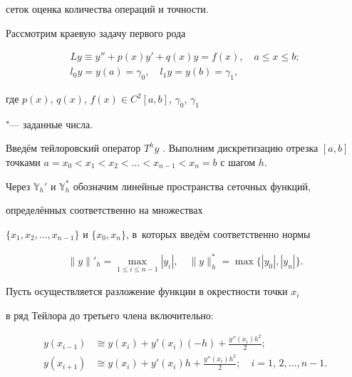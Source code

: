 сеток оценка количества операций и точности.



\smallskip




Рассмотрим краевую задачу первого рода

\begin{gather}

\label{pavlova:eq1}

 Ly\equiv y''+p(x)y'+q(x)y=f(x),\quad a\le x\le b;\\

\label{pavlova:eq2}

 l_0 y=y(a)=\gamma_0,\quad l_1y=y(b)=\gamma_1,

\end{gather}

где $p(x)$, $q(x)$, $f(x)\in C^2[a,b]$, $\gamma_0$, $\gamma_1$

"--- заданные числа.



Введём тейлоровский оператор $T^hy$ \cite{pavlova:bib1}. Выполним дискретизацию отрезка $[a,b]$ точками $a=x_0<x_1<x_2<\ldots <x_{n-1}<x_n=b$ с шагом $h$. 

Через $\mathbb{Y}_h'$ и $\mathbb{Y}_h^*$ обозначим линейные пространства сеточных функций,

определённых соответственно на множествах

$\{x_1,x_2,\ldots,x_{n-1}\}$ и $\{x_0,x_n\}$, в~которых введём соответственно нормы

\begin{gather*}

\|y \|'_h=\max \limits_{1\leq i \leq n-1} |y_i|,\quad 

\|y \|^*_h=\max\{|y_0|,|y_n|\}.

\end{gather*}

Пусть осуществляется разложение функции в окрестности точки $x_i$

в ряд Тейлора до третьего члена включительно:

\begin{equation}

\label{pavlova:eq3}

\begin{aligned}

 y(x_{i-1})&\cong y(x_i)+y'(x_i)(-h)+\frac{y''(x_i )h^2}{2}; \\

 y(x_{i+1})&\cong y(x_i)+y'(x_i )h+\frac{y''(x_i )h^2}{2}; \quad i=1,\,2,\ldots,n-1.

\end{aligned}

\end{equation}

